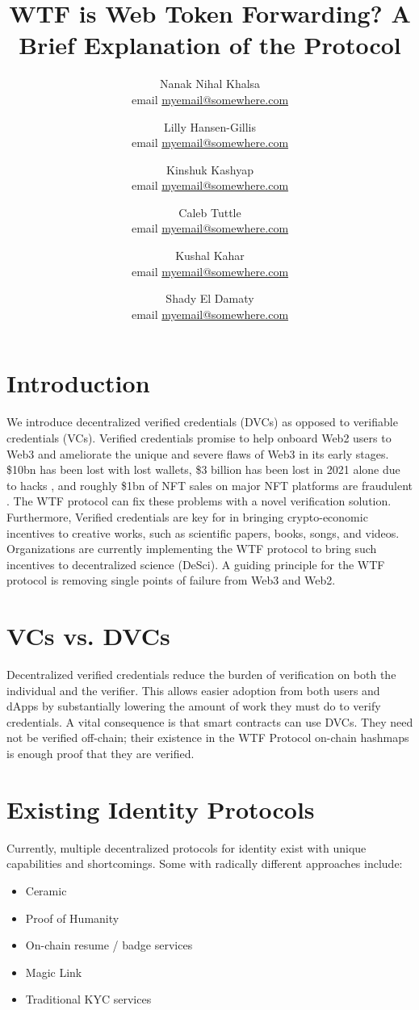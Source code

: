 \documentclass[11pt,oneside,a4paper]{article}
\title{WTF is Web Token Forwarding? A Brief Explanation of the Protocol}
\author{Nanak Nihal Khalsa \\ email \href{mailto:my_email_address}{myemail@somewhere.com} 
	\and Lilly Hansen-Gillis \\ email \href{mailto:my_email_address}{myemail@somewhere.com}
	\and Kinshuk Kashyap \\ email \href{mailto:my_email_address}{myemail@somewhere.com}
	\and Caleb Tuttle \\ email \href{mailto:my_email_address}{myemail@somewhere.com}
	\and Kushal Kahar \\ email \href{mailto:my_email_address}{myemail@somewhere.com}
   \and Shady El Damaty \\ email \href{mailto:my_email_address}{myemail@somewhere.com}}
\begin{document}
\maketitle
\section{Introduction}
	We introduce decentralized verified credentials (DVCs) as opposed to verifiable credentials (VCs). Verified credentials promise to help onboard  Web2 users to Web3 and ameliorate the unique and severe flaws of Web3 in its early stages. \$10bn has been lost with lost wallets, \$3 billion has been lost in 2021 alone due to hacks \cite{chainalysis}, and roughly \$1bn of NFT sales on major NFT platforms  are fraudulent \cite{opensea_tweet, dune_anal}. The WTF protocol can fix these problems with a novel verification solution. Furthermore, Verified credentials are key for in bringing crypto-economic incentives to creative works, such as scientific papers, books, songs, and videos. Organizations are currently implementing the WTF protocol to bring such incentives to decentralized science (DeSci). A guiding principle for the WTF protocol is removing single points of failure from Web3 and Web2.
	
\section{VCs vs. DVCs}	
Decentralized verified credentials reduce the burden of verification on both the individual and the verifier. This allows easier adoption from both users and dApps by substantially lowering the amount of work they must do to verify credentials. A vital consequence is that smart contracts can use DVCs. They need not be verified off-chain; their existence in the WTF Protocol on-chain hashmaps is enough proof that they are verified. 

\section{Existing Identity Protocols}
Currently, multiple decentralized protocols for identity exist with unique capabilities and shortcomings. Some with radically different approaches include:
	\begin{itemize}
		\item Ceramic
		\item Proof of Humanity
		\item On-chain resume / badge services
		\item Magic Link
		\item Traditional KYC services
	\end{itemize}
	
\end{document}
